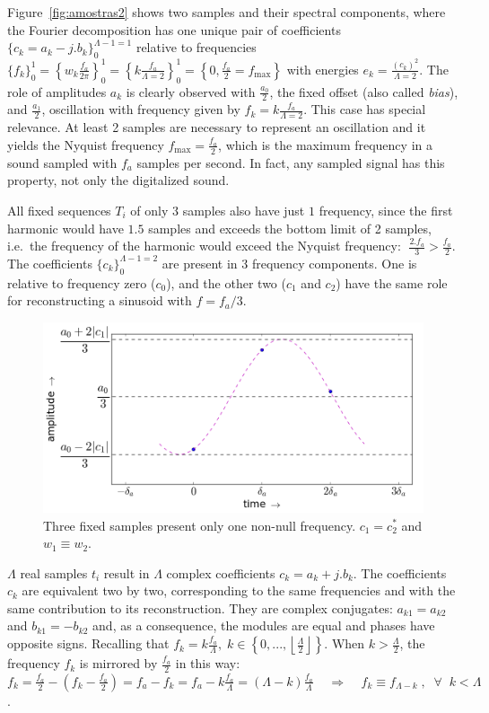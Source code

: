 Figure~\ref{fig:amostras2} shows two samples and their spectral components, where the Fourier decomposition has one unique pair of coefficients $\{c_k=a_k-j.b_k\}_0^{\Lambda-1=1}$ relative to frequencies $\{f_k\}_0^1=\left\{w_k\frac{f_a}{2\pi}\right\}_0^1=\left\{k\frac{f_a}{\Lambda=2}\right\}_0^1=\left\{0,\frac{f_a}{2}=f_{\text{max}}\right\}$
with energies $e_k=\frac{(c_k)^2}{\Lambda=2}$. The role of amplitudes $a_k$ is clearly observed with $\frac{a_0}{2}$, the fixed offset (also called \emph{bias}), and $\frac{a_1}{2}$, oscillation with frequency given by $f_k=k \frac{f_a}{\Lambda=2}$.
This case has special relevance. At least 2 samples are necessary to represent an oscillation and it yields the Nyquist frequency $f_{\text{max}}=\frac{f_a}{2}$, which is the maximum frequency in a sound sampled with $f_a$ samples per second. In fact, any sampled signal has this property, not only the digitalized sound.

All fixed sequences $T_i$ of only $3$ samples also have just $1$ frequency, since the first harmonic would have $1.5$ samples and exceeds the bottom limit of 2 samples, i.e.\ the frequency of the harmonic would exceed the Nyquist frequency:  $\; \frac{2. f_a}{3} > \frac{f_a}{2}$. 
The coefficients $\{c_k\}_0^{\Lambda-1=2}$ are present in 3 frequency components. One is relative to frequency zero ($c_0$), and the other two ($c_1$ and $c_2$) have the same role for reconstructing a sinusoid with $f=f_a/3$.

 \begin{figure}
     \centering
         \includegraphics[width=.7\textwidth]{figures/amostras3b_}
     \caption{Three fixed samples present only one non-null frequency. $c_1=c_2^*$ and $w_1 \equiv w_2$.}
         \label{fig:amostras3}
 \end{figure}

$\Lambda$ real samples $t_i$ result in $\Lambda$ complex coefficients $c_k=a_k+j.b_k$. The coefficients $c_k$ are equivalent two by two, corresponding to the same frequencies and with the same contribution to its reconstruction. They are complex conjugates: $a_{k1}=a_{k2}$ and $b_{k1}=-b_{k2}$ and, as a consequence, the modules are equal and phases have opposite signs. Recalling that $f_k = k\frac{f_a}{\Lambda}, \; k \in \left\{0, ..., \left \lfloor \frac{\Lambda}{2} \right \rfloor \right\} $. When $k > \frac{\Lambda}{2}$, the frequency $f_k$ is mirrored by $\frac{f_a}{2}$ in this way: $f_k=\frac{f_a}{2} - (f_k-\frac{f_a}{2})=f_a-f_k=f_a - k\frac{f_a}{\Lambda}=(\Lambda-k)\frac{f_a}{\Lambda} \;\;\;\; \Rightarrow \;\;\;\; f_k\equiv f_{\Lambda-k} \; ,\;\; \forall \;\; k<\Lambda$. 

